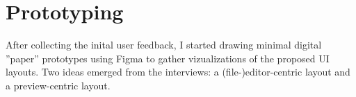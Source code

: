 
%
\chapter{Prototyping}
\label{chap:prototyping} 

After collecting the inital user feedback, I started drawing minimal digital ''paper'' prototypes using Figma to gather vizualizations of the proposed UI layouts.
Two ideas emerged from the interviews: a (file-)editor-centric layout and a preview-centric layout.

